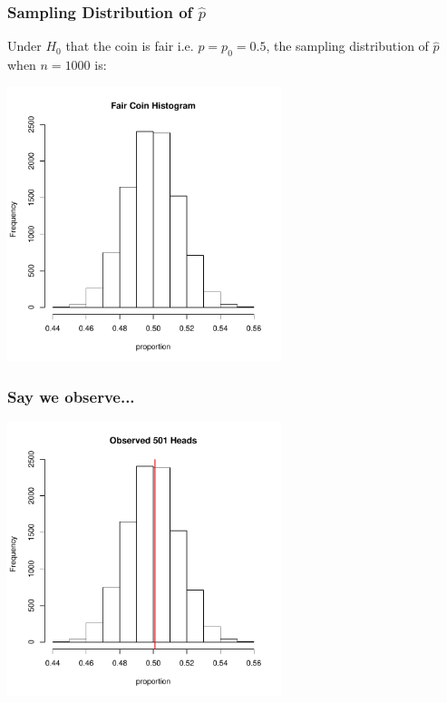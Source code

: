 \documentclass[handout]{beamer}
\newcommand{\blue}[1]{\textcolor{blue2}{#1}}
\begin{document}
\begin{frame}
\frametitle{Sampling Distribution of $\widehat{p}$}
\blue{Under $H_0$ that the coin is fair} i.e. $p=p_0=0.5$, the sampling distribution of $\widehat{p}$ when $n=1000$ is:

\begin{center}
\includegraphics[width=0.6\textwidth]{figure/hist1}
\end{center}
\end{frame}


\begin{frame}
\frametitle{Say we observe...}
\begin{center}
\includegraphics[width=0.6\textwidth]{figure/hist2}
\end{center}
\end{frame}
\end{document}
